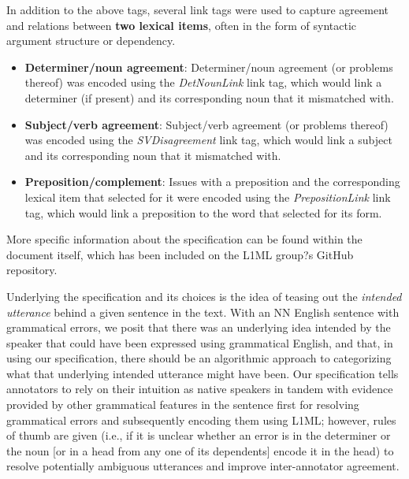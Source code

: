 \documentclass[10pt, a4paper]{article}
\begin{document}
In addition to the above tags, several link tags were used to capture agreement and relations between \textbf{two lexical items}, often in the form of syntactic argument structure or dependency. 

\begin{itemize}
	\item \textbf{Determiner/noun agreement}: Determiner/noun agreement (or problems thereof) was encoded using the \textit{DetNounLink} link tag, which would link a determiner (if present) and its corresponding noun that it mismatched with.
	\item \textbf{Subject/verb agreement}: Subject/verb agreement (or problems thereof) was encoded using the \textit{SVDisagreement} link tag, which would link a subject and its corresponding noun that it mismatched with. 
	\item \textbf{Preposition/complement}: Issues with a preposition and the corresponding lexical item that selected for it were encoded using the \textit{PrepositionLink} link tag, which would link a preposition to the word that selected for its form. 
\end{itemize}

More specific information about the specification can be found within the document itself, which has been included on the L1ML group?s GitHub repository. 

Underlying the specification and its choices is the idea of teasing out the \textit{intended utterance} behind a given sentence in the text. With an NN English sentence with grammatical errors, we posit that there was an underlying idea intended by the speaker that could have been expressed using grammatical English, and that, in using our specification, there should be an algorithmic approach to categorizing what that underlying intended utterance might have been. Our specification tells annotators to rely on their intuition as native speakers in tandem with evidence provided by other grammatical features in the sentence first for resolving grammatical errors and subsequently encoding them using L1ML; however, rules of thumb are given (i.e., if it is unclear whether an error is in the determiner or the noun [or in a head from any one of its dependents] encode it in the head) to resolve potentially ambiguous utterances and improve inter-annotator agreement.  
\end{document}
